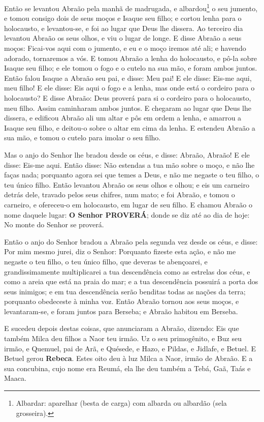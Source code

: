 Então se levantou Abraão pela manhã de madrugada, e
albardou\footnote{Albardar: aparelhar (besta de carga) com albarda
ou albardão (sela grosseira).} o seu jumento, e tomou consigo dois
de seus moços e Isaque seu filho; e cortou lenha para o holocausto,
e levantou-se, e foi ao lugar que Deus lhe dissera. Ao terceiro
dia levantou Abraão os seus olhos, e viu o lugar de longe. E
disse Abraão a seus moços: Ficai-vos aqui com o jumento, e eu e o
moço iremos até ali; e havendo adorado, tornaremos a vós. E
tomou Abraão a lenha do holocausto, e pô-la sobre Isaque seu filho;
e ele tomou o fogo e o cutelo na sua mão, e foram ambos juntos.
Então falou Isaque a Abraão seu pai, e disse: Meu pai! E ele
disse: Eis-me aqui, meu filho! E ele disse: Eis aqui o fogo e a
lenha, mas onde está o cordeiro para o holocausto? E disse
Abraão: Deus proverá para si o cordeiro para o holocausto, meu
filho. Assim caminharam ambos juntos. E chegaram ao lugar que
Deus lhe dissera, e edificou Abraão ali um altar e pôs em ordem a
lenha, e amarrou a Isaque seu filho, e deitou-o sobre o altar em
cima da lenha. E estendeu Abraão a sua mão, e tomou o cutelo
para imolar o seu filho.

Mas o anjo do Senhor lhe bradou desde os céus, e disse: Abraão,
Abraão! E ele disse: Eis-me aqui. Então disse: Não estendas a
tua mão sobre o moço, e não lhe faças nada; porquanto agora sei que
temes a Deus, e não me negaste o teu filho, o teu único filho.
Então levantou Abraão os seus olhos e olhou; e eis um
carneiro detrás dele, travado pelos seus chifres, num mato; e foi
Abraão, e tomou o carneiro, e ofereceu-o em holocausto, em lugar de
seu filho. E chamou Abraão o nome daquele lugar: \textbf{O
Senhor PROVERÁ}; donde se diz até ao dia de hoje: No monte do Senhor
se proverá.

Então o anjo do Senhor bradou a Abraão pela segunda vez desde os
céus, e disse: Por mim mesmo jurei, diz o Senhor: Porquanto
fizeste esta ação, e não me negaste o teu filho, o teu único filho,
que deveras te abençoarei, e grandissimamente multiplicarei a
tua descendência como as estrelas dos céus, e como a areia que está
na praia do mar; e a tua descendência possuirá a porta dos seus
inimigos; e em tua descendência serão benditas todas as
nações da terra; porquanto obedeceste à minha voz. Então
Abraão tornou aos seus moços, e levantaram-se, e foram juntos para
Berseba; e Abraão habitou em Berseba.

E sucedeu depois destas coisas, que anunciaram a Abraão, dizendo:
Eis que também Milca deu filhos a Naor teu irmão. Uz o seu
primogênito, e Buz seu irmão, e Quemuel, pai de Arã, e
Quésede, e Hazo, e Pildas, e Jidlafe, e Betuel. E Betuel
gerou \textbf{Rebeca}. Estes oito deu à luz Milca a Naor, irmão de
Abraão. E a sua concubina, cujo nome era Reumá, ela lhe deu
também a Tebá, Gaã, Taás e Maaca.

